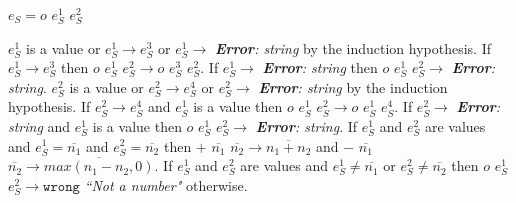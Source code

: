\begin{case}

$e_{S}=o$ $e_{S}^{1}$ $e_{S}^{2}$

$e_{S}^{1}$ is a value or $e_{S}^{1}\rightarrow e_{S}^{3}$ or $e_{S}^{1}\rightarrow$ \emph{\textbf{Error}: string} by the induction hypothesis.  If $e_{S}^{1}\rightarrow e_{S}^{3}$ then $o$ $e_{S}^{1}$ $e_{S}^{2}\rightarrow o$ $e_{S}^{3}$ $e_{S}^{2}$.  If $e_{S}^{1}\rightarrow$ \emph{\textbf{Error}: string} then $o$ $e_{S}^{1}$ $e_{S}^{2}\rightarrow$ \emph{\textbf{Error}: string}.  $e_{S}^{2}$ is a value or $e_{S}^{2}\rightarrow e_{S}^{4}$ or $e_{S}^{2}\rightarrow$ \emph{\textbf{Error}: string} by the induction hypothesis.  If $e_{S}^{2}\rightarrow e_{S}^{4}$ and $e_{S}^{1}$ is a value then $o$ $e_{S}^{1}$ $e_{S}^{2}\rightarrow o$ $e_{S}^{1}$ $e_{S}^{4}$.  If $e_{S}^{2}\rightarrow$ \emph{\textbf{Error}: string} and $e_{S}^{1}$ is a value then $o$ $e_{S}^{1}$ $e_{S}^{2}\rightarrow$ \emph{\textbf{Error}: string}.  If $e_{S}^{1}$ and $e_{S}^{2}$ are values and $e_{S}^{1}=\overline{n_{1}}$ and $e_{S}^{2}=\overline{n_{2}}$ then $+$ $\overline{n_{1}}$ $\overline{n_{2}}\rightarrow\overline{n_{1}+n_{2}}$ and $-$ $\overline{n_{1}}$ $\overline{n_{2}}\rightarrow\overline{max(n_{1}-n_{2},0)}$.  If $e_{S}^{1}$ and $e_{S}^{2}$ are values and $e_{S}^{1}\neq\overline{n_{1}}$ or $e_{S}^{2}\neq\overline{n_{2}}$ then $o$ $e_{S}^{1}$ $e_{S}^{2}\rightarrow\mathtt{wrong}$ \emph{``Not a number"} otherwise.

\end{case}